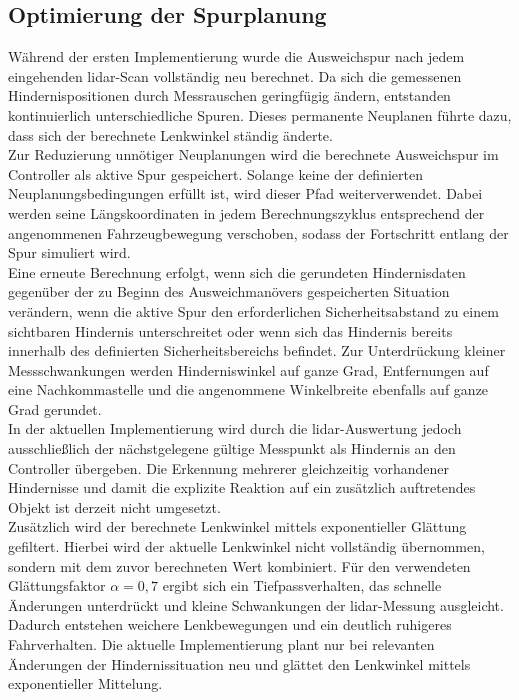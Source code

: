 \subsection{Optimierung der Spurplanung}
Während der ersten Implementierung wurde die Ausweichspur nach jedem eingehenden \gls{lidar}-Scan vollständig neu berechnet. Da sich die gemessenen Hindernispositionen durch Messrauschen geringfügig ändern, entstanden kontinuierlich unterschiedliche Spuren.
Dieses permanente Neuplanen führte dazu, dass sich der berechnete Lenkwinkel ständig änderte.
\\
Zur Reduzierung unnötiger Neuplanungen wird die berechnete Ausweichspur im Controller als aktive Spur gespeichert. Solange keine der definierten Neuplanungsbedingungen erfüllt ist, wird dieser Pfad weiterverwendet. Dabei werden seine Längskoordinaten in jedem Berechnungszyklus entsprechend der angenommenen Fahrzeugbewegung verschoben, sodass der Fortschritt entlang der Spur simuliert wird.
\\
Eine erneute Berechnung erfolgt, wenn sich die gerundeten Hindernisdaten gegenüber der zu Beginn des Ausweichmanövers gespeicherten Situation verändern, wenn die aktive Spur den erforderlichen Sicherheitsabstand zu einem sichtbaren Hindernis unterschreitet oder wenn sich das Hindernis bereits innerhalb des definierten Sicherheitsbereichs befindet. Zur Unterdrückung kleiner Messschwankungen werden Hinderniswinkel auf ganze Grad, Entfernungen auf eine Nachkommastelle und die angenommene Winkelbreite ebenfalls auf ganze Grad gerundet.
\\
In der aktuellen Implementierung wird durch die \gls{lidar}-Auswertung jedoch ausschließlich der nächstgelegene gültige Messpunkt als Hindernis an den Controller übergeben. Die Erkennung mehrerer gleichzeitig vorhandener Hindernisse und damit die explizite Reaktion auf ein zusätzlich auftretendes Objekt ist derzeit nicht umgesetzt.
\\
Zusätzlich wird der berechnete Lenkwinkel mittels exponentieller Glättung gefiltert. Hierbei wird der aktuelle Lenkwinkel nicht vollständig übernommen, sondern mit dem zuvor berechneten Wert kombiniert. Für den verwendeten Glättungsfaktor $\alpha = 0,7$ ergibt sich ein Tiefpassverhalten, das schnelle Änderungen unterdrückt und kleine Schwankungen der \gls{lidar}-Messung ausgleicht. Dadurch entstehen weichere Lenkbewegungen und ein deutlich ruhigeres Fahrverhalten. Die aktuelle Implementierung plant nur bei relevanten Änderungen der Hindernissituation neu und glättet den Lenkwinkel mittels exponentieller Mittelung.

